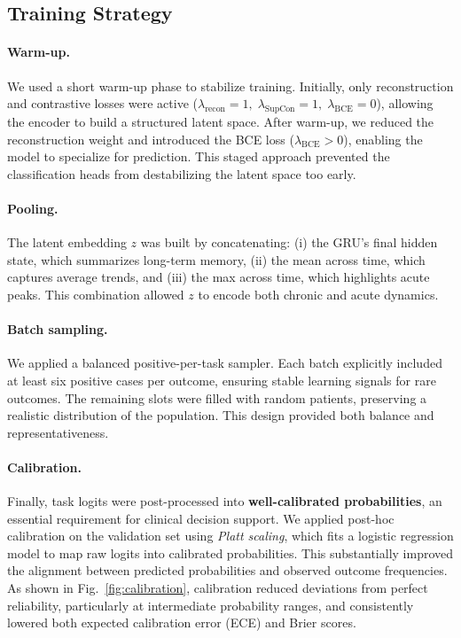 \documentclass{article}
\theoremstyle{plain}
\theoremstyle{definition}
\theoremstyle{remark}
\begin{document}
\subsection{Training Strategy}

\paragraph{Warm-up.}  
We used a short warm-up phase to stabilize training. Initially, only reconstruction and 
contrastive losses were active 
($\lambda_{\text{recon}}{=}1,\;\lambda_{\text{SupCon}}{=}1,\;\lambda_{\text{BCE}}{=}0$), 
allowing the encoder to build a structured latent space.  
After warm-up, we reduced the reconstruction weight and introduced the BCE loss 
($\lambda_{\text{BCE}}>0$), enabling the model to specialize for prediction.  
This staged approach prevented the classification heads from destabilizing the latent 
space too early.

\paragraph{Pooling.}  
The latent embedding $z$ was built by concatenating:  
(i) the GRU’s final hidden state, which summarizes long-term memory,  
(ii) the mean across time, which captures average trends, and  
(iii) the max across time, which highlights acute peaks.  
This combination allowed $z$ to encode both chronic and acute dynamics.

\paragraph{Batch sampling.}  
We applied a balanced positive-per-task sampler. Each batch explicitly included at least 
six positive cases per outcome, ensuring stable learning signals for rare outcomes. 
The remaining slots were filled with random patients, preserving a realistic distribution 
of the population. This design provided both balance and representativeness.

\paragraph{Calibration.} 
Finally, task logits were post-processed into \textbf{well-calibrated probabilities}, an essential requirement for clinical decision support. 
We applied post-hoc calibration on the validation set using \textit{Platt scaling}, which fits a logistic regression model to map raw logits into calibrated probabilities. 
This substantially improved the alignment between predicted probabilities and observed outcome frequencies. 
As shown in Fig.~\ref{fig:calibration}, calibration reduced deviations from perfect reliability, particularly at intermediate probability ranges, and consistently lowered both expected calibration error (ECE) and Brier scores. 
\end{document}

